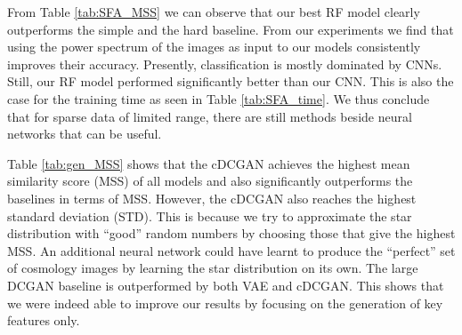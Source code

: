 \documentclass[10pt,conference,compsocconf]{IEEEtran}
\begin{document}

From Table \ref{tab:SFA_MSS} we can observe that our best RF model clearly outperforms the simple and the hard baseline. From our experiments we find that using the power spectrum of the images as input to our models consistently improves their accuracy. Presently, classification is mostly dominated by CNNs. Still, our RF model performed significantly better than our CNN. This is also the case for the training time as seen in Table \ref{tab:SFA_time}. We thus conclude that for sparse data of limited range, there are still methods beside neural networks that can be useful.


Table \ref{tab:gen_MSS} shows that the cDCGAN achieves the highest mean similarity score (MSS) of all models and also significantly outperforms the baselines in terms of MSS. However, the cDCGAN also reaches the highest standard deviation (STD). This is because we try to approximate the star distribution with ``good'' random numbers by choosing those that give the highest MSS. An additional neural network could have learnt to produce the ``perfect'' set of cosmology images by learning the star distribution on its own. %
The large DCGAN baseline is outperformed by both VAE and cDCGAN. This shows that we were indeed able to improve our results by focusing on the generation of key features only.


\end{document}
